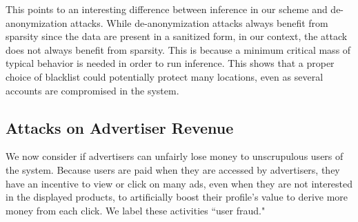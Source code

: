This points to an interesting difference between inference in our scheme and de-anonymization attacks. While de-ano\-ny\-mi\-za\-tion attacks always benefit from sparsity since the data are present in a sanitized form, in our context, the attack does not always benefit from sparsity. This is because a minimum critical mass of typical behavior is needed in order to run inference. This shows that a proper choice of blacklist could potentially protect many locations, even as several accounts are compromised in the system. 



\subsection{Attacks on Advertiser Revenue}
We now consider if advertisers can unfairly lose money to unscrupulous users of the system.
Because users are paid when they are accessed by advertisers, they have an incentive to view or click on many ads, even when they are not interested in the displayed products, to artificially boost their profile's value to derive more money from each click.
We label these activities ``user fraud." %

